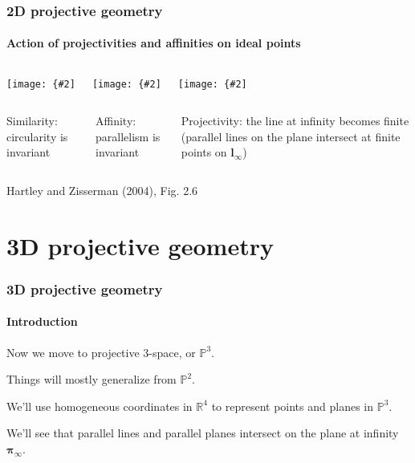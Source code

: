\documentclass[aspectratio=169]{beamer}
\renewcommand{\vec}[1]{\boldsymbol{#1}}
\def\Rset{\mathbb{R}}
\def\Pset{\mathbb{P}}
\newcommand{\myfig}[3]{\centerline{\texttt{[image: \{\#2]}}}
    \centerline{\scriptsize #3}}
\begin{document}
\begin{frame}
\frametitle{2D projective geometry}
\framesubtitle{Action of projectivities and affinities on ideal points}

\begin{columns}
\column{1.5in}
\myfig{1.4in}{HZ-fig1-6a}{}
\column{1.5in}
\myfig{1.4in}{HZ-fig1-6b}{}
\column{1.5in}
\myfig{1.4in}{HZ-fig1-6c}{}
\end{columns}

\begin{columns}[T]
\column{1.5in}
\parbox{1.4in}{Similarity: circularity is invariant}
\column{1.5in}
\parbox{1.4in}{Affinity: parallelism is invariant}
\column{1.5in}
\parbox{1.4in}{Projectivity: the line at infinity becomes finite
  (parallel lines on the plane intersect at finite points on
  $\vec{l}_{\infty}$)}
\end{columns}

\centerline{\scriptsize Hartley and Zisserman (2004), Fig. 2.6}

\end{frame}

\section{3D projective geometry}

\begin{frame}
\frametitle{3D projective geometry}
\framesubtitle{Introduction}

Now we move to \alert{projective 3-space}, or $\Pset^3$.

\medskip

Things will mostly generalize from $\Pset^2$.

\medskip

We'll use homogeneous coordinates in $\Rset^4$ to represent points
\alert{and planes} in $\Pset^3$.

\medskip

We'll see that parallel lines and parallel planes intersect on the
\alert{plane at infinity} $\vec{\pi}_{\infty}$.

\end{frame}
\end{document}

